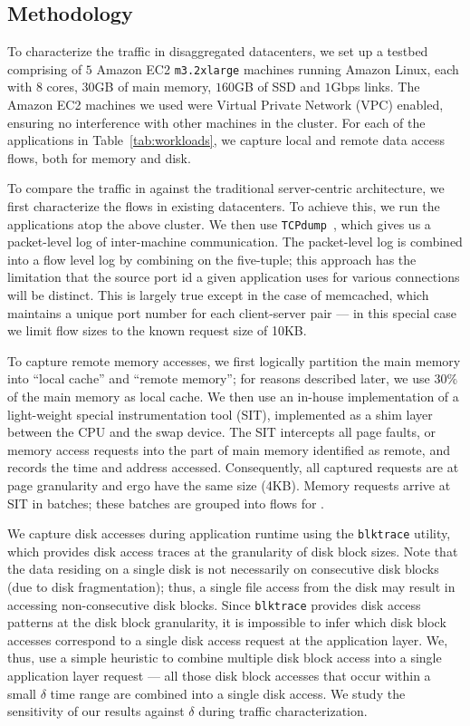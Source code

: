\subsection{Methodology}
\label{ssec:method1} 
To characterize the traffic in disaggregated datacenters, we set up a testbed comprising of $5$ Amazon EC2 \texttt{m3.2xlarge} machines running Amazon Linux, each with $8$ cores, $30$GB of main memory, $160$GB of SSD and $1$Gbps links. The Amazon EC2 machines we used were Virtual Private Network (VPC) enabled, ensuring no interference with other machines in the cluster. For each of the applications in Table~\ref{tab:workloads}, we capture local and remote data access flows, both for memory and disk.

To compare the traffic in \dis against the traditional server-centric architecture, we first characterize the flows in existing datacenters. To achieve this, we run the applications atop the above cluster. We then use {\tt TCPdump}~\cite{tcpdump}, which gives us a packet-level log of inter-machine communication. The packet-level log is combined into a flow level log by combining on the five-tuple; this approach has the limitation that the source port id a given application uses for various connections will be distinct. This is largely true except in the case of memcached, which maintains a unique port number for each client-server pair --- in this special case we limit flow sizes to the known request size of 10KB.

To capture remote memory accesses, we first logically partition the main memory into ``local cache'' and ``remote memory''; for reasons described later, we use $30\%$ of the main memory as local cache. We then use an in-house implementation of a light-weight special instrumentation tool (SIT), implemented as a shim layer between the CPU and the swap device. The SIT intercepts all page faults, or memory access requests into the part of main memory identified as remote, and records the time and address accessed. Consequently, all captured requests are at page granularity and ergo have the same size (4KB). Memory requests arrive at SIT in batches; these batches are grouped into flows for \dis.

We capture disk accesses during application runtime using the {\tt blktrace} utility, which provides disk access traces at the granularity of disk block sizes. Note that the data residing on a single disk is not necessarily on consecutive disk blocks (due to disk fragmentation); thus, a single file access from the disk may result in accessing non-consecutive disk blocks. Since {\tt blktrace} provides disk access patterns at the disk block granularity, it is impossible to infer which disk block accesses correspond to a single disk access request at the application layer. We, thus, use a simple heuristic to combine multiple disk block access into a single application layer request --- all those disk block accesses that occur within a small $\delta$ time range are combined into a single disk access. We study the sensitivity of our results against $\delta$ during traffic characterization. 


